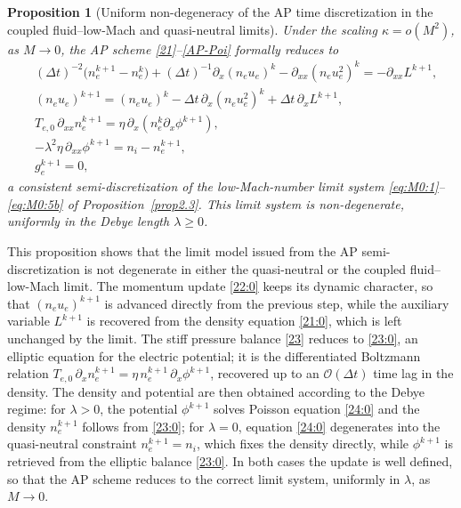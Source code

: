 \documentclass[pdflatex,final,10pt]{article}
\newtheorem{proposition}{Proposition}[section]
\newenvironment{del}
  {}
  {}
\begin{document}
\begin{del}
\begin{proposition}[Uniform non-degeneracy of the AP time discretization in the coupled fluid--low-Mach and quasi-neutral limits]
\label{prop-semidis-lowmach_model}
Under the scaling $\kappa = o(M^2)$, as $M \to 0$, the AP scheme \eqref{21}--\eqref{AP-Poi}
formally reduces to
\begin{align}
    &(\Delta t)^{-2}\big(n_e^{k+1}-n_e^k\big)
      + (\Delta t)^{-1}\partial_x(n_e u_e)^k
      - \partial_{xx}(n_e u_e^2)^k = -\partial_{xx} L^{k+1},\label{21:0} \\
    &(n_e u_e)^{k+1} = (n_e u_e)^k
      - \Delta t\,\partial_x(n_e u_e^2)^k
      + \Delta t\,\partial_x L^{k+1},\label{22:0} \\
    &T_{e,0}\,\partial_{xx} n_e^{k+1} = \eta\,\partial_x(n_e^k \partial_x \phi^{k+1}), \label{23:0} \\
    &-\lambda^2 \eta\,\partial_{xx} \phi^{k+1} = n_i - n_e^{k+1}, \label{24:0}\\
    &g_e^{k+1} = 0,\label{25:0}
\end{align}
a consistent semi-discretization of the low-Mach-number limit system \eqref{eq:M0:1}--\eqref{eq:M0:5b} of Proposition~\ref{prop2.3}. This limit system is non-degenerate, uniformly in the Debye length $\lambda \ge 0$.
\end{proposition}
This proposition shows that the limit model issued from the AP semi-discretization is not degenerate in either the quasi-neutral or the coupled fluid--low-Mach limit. The momentum update \eqref{22:0} keeps its dynamic character, so that $(n_e u_e)^{k+1}$ is advanced directly from the previous step, while the auxiliary variable $L^{k+1}$ is recovered from the density equation \eqref{21:0}, which is left unchanged by the limit. The stiff pressure balance \eqref{23} reduces to \eqref{23:0}, an elliptic equation for the electric potential; it is the differentiated Boltzmann relation $T_{e,0}\,\partial_x n_e^{k+1} = \eta\, n_e^{k+1}\,\partial_x \phi^{k+1}$, recovered up to an $\mathcal{O}(\Delta t)$ time lag in the density. The density and potential are then obtained according to the Debye regime: for $\lambda > 0$, the potential $\phi^{k+1}$ solves Poisson equation \eqref{24:0} and the density $n_e^{k+1}$ follows from \eqref{23:0}; for $\lambda = 0$, equation \eqref{24:0} degenerates into the quasi-neutral constraint $n_e^{k+1} = n_i$, which fixes the density directly, while $\phi^{k+1}$ is retrieved from the elliptic balance \eqref{23:0}. In both cases the update is well defined, so that the AP scheme reduces to the correct limit system, uniformly in $\lambda$, as $M \to 0$.



\end{del}
\end{document}
